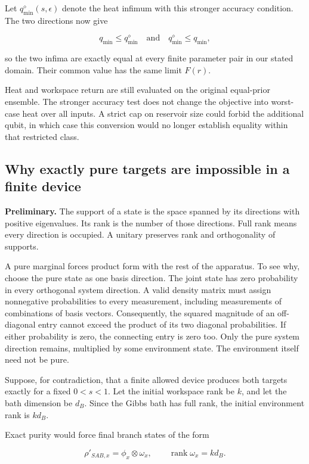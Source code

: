 \documentclass[11pt,letterpaper]{article}
\begin{document}
Let \(q_{\min}^{\diamond}(s,\epsilon)\) denote the heat infimum with this stronger accuracy condition. The two directions now give

\[q_{\min} \leq q_{\min}^{\diamond}\quad\text{and}\quad q_{\min}^{\diamond} \leq q_{\min},\]

so the two infima are exactly equal at every finite parameter pair in our stated domain. Their common value has the same limit \(F(r)\).

Heat and workspace return are still evaluated on the original equal-prior ensemble. The stronger accuracy test does not change the objective into worst-case heat over all inputs. A strict cap on reservoir size could forbid the additional qubit, in which case this conversion would no longer establish equality within that restricted class.

\subsection{Why exactly pure targets are impossible in a finite device}\label{subsec:exact-output}

\textbf{Preliminary.} The support of a state is the space spanned by its directions with positive eigenvalues. Its rank is the number of those directions. Full rank means every direction is occupied. A unitary preserves rank and orthogonality of supports.

A pure marginal forces product form with the rest of the apparatus. To see why, choose the pure state as one basis direction. The joint state has zero probability in every orthogonal system direction. A valid density matrix must assign nonnegative probabilities to every measurement, including measurements of combinations of basis vectors. Consequently, the squared magnitude of an off-diagonal entry cannot exceed the product of its two diagonal probabilities. If either probability is zero, the connecting entry is zero too. Only the pure system direction remains, multiplied by some environment state. The environment itself need not be pure.

Suppose, for contradiction, that a finite allowed device produces both targets exactly for a fixed \(0 < s < 1\). Let the initial workspace rank be \(k\), and let the bath dimension be \(d_{B}\). Since the Gibbs bath has full rank, the initial environment rank is \(kd_{B}\).

Exact purity would force final branch states of the form

\[\rho\prime_{SAB,x} = \phi_{x} \otimes \omega_{x},\quad\quad \operatorname{rank}\omega_{x} = kd_{B}.\]
\end{document}
